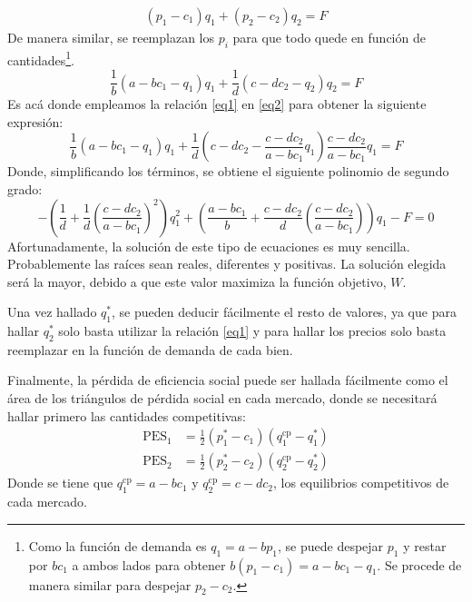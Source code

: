 \documentclass{article}
\begin{document}
\begin{align*}
    (p_1-c_1)q_1 + (p_2-c_2)q_2 = F
\end{align*}
De manera similar, se reemplazan los $p_i$ para que todo quede en función de cantidades\footnote{Como la función de demanda es $q_1 = a - bp_1$, se puede despejar $p_1$ y restar por $bc_1$ a ambos lados para obtener $b(p_1 - c_1) = a - bc_1 - q_1$. Se procede de manera similar para despejar $p_2 - c_2$.}.
\begin{equation}
    \frac{1}{b}(a - bc_1 - q_1)q_1 + \frac{1}{d}(c - dc_2 - q_2)q_2 = F \tag{2}\label{eq2}
\end{equation}
Es acá donde empleamos la relación \eqref{eq1} en \eqref{eq2} para obtener la siguiente expresión:
\begin{equation*}
    \frac{1}{b}(a - bc_1 - q_1)q_1 + \frac{1}{d}\left(c - dc_2 - \frac{c-dc_2}{a - bc_1}q_1\right)\frac{c-dc_2}{a - bc_1}q_1 = F 
\end{equation*}
Donde, simplificando los términos, se obtiene el siguiente polinomio de segundo grado:
\begin{equation}
    -\left( \frac{1}{d} + \frac{1}{d}\left( \frac{c-dc_2}{a-bc_1} \right)^2\right)q_1^2 + \left( \frac{a-bc_1}{b} + \frac{c-dc_2}{d}\left( \frac{c-dc_2}{a-bc_1} \right)\right)q_1 - F = 0 \label{eq3} \tag{3}
\end{equation}
\newpage
Afortunadamente, la solución de este tipo de ecuaciones es muy sencilla. Probablemente las raíces sean reales, diferentes y positivas. La solución elegida será la mayor, debido a que este valor maximiza la función objetivo, $W$.

Una vez hallado $q_1^*$, se pueden deducir fácilmente el resto de valores, ya que para hallar $q_2^*$ solo basta utilizar la relación \eqref{eq1} y para hallar los precios solo basta reemplazar en la función de demanda de cada bien.

Finalmente, la pérdida de eficiencia social puede ser hallada fácilmente como el área de los triángulos de pérdida social en cada mercado, donde se necesitará hallar primero las cantidades competitivas:
\begin{align*}
    \text{PES}_1 &= \frac{1}{2} \left(p_1^* - c_1\right)\left(q_1^{\text{cp}} - q_1^*\right) \\
    \text{PES}_2 &= \frac{1}{2} \left(p_2^* - c_2\right)\left(q_2^{\text{cp}} - q_2^*\right)
\end{align*}
Donde se tiene que $q_1^{\text{cp}} = a - bc_1$ y $q_2^{\text{cp}} = c - dc_2$, los equilibrios competitivos de cada mercado.
\end{document}
